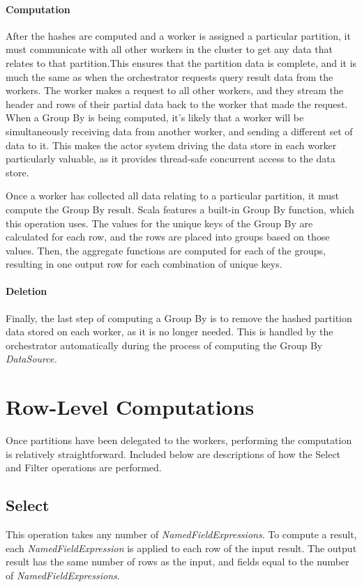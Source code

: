 \paragraph{Computation}
After the hashes are computed and a worker is assigned a particular partition, it must communicate with all other workers in the cluster to get any data that relates to that partition.This ensures that the partition data is complete, and it is much the same as when the orchestrator requests query result data from the workers. The worker makes a request to all other workers, and they stream the header and rows of their partial data back to the worker that made the request. When a Group By is being computed, it's likely that a worker will be simultaneously receiving data from another worker, and sending a different set of data to it. This makes the actor system driving the data store in each worker particularly valuable, as it provides thread-safe concurrent access to the data store.

Once a worker has collected all data relating to a particular partition, it must compute the Group By result. Scala features a built-in Group By function, which this operation uses. The values for the unique keys of the Group By are calculated for each row, and the rows are placed into groups based on those values. Then, the aggregate functions are computed for each of the groups, resulting in one output row for each combination of unique keys. 

\paragraph{Deletion}
Finally, the last step of computing a Group By is to remove the hashed partition data stored on each worker, as it is no longer needed. This is handled by the orchestrator automatically during the process of computing the Group By \textit{DataSource.}

\section{Row-Level Computations}
Once partitions have been delegated to the workers, performing the computation is relatively straightforward. Included below are descriptions of how the Select and Filter operations are performed.

\subsection{Select} 
This operation takes any number of \textit{NamedFieldExpressions}. To compute a result, each \textit{NamedFieldExpression} is applied to each row of the input result. The output result has the same number of rows as the input, and fields equal to the number of \textit{NamedFieldExpressions}. 

